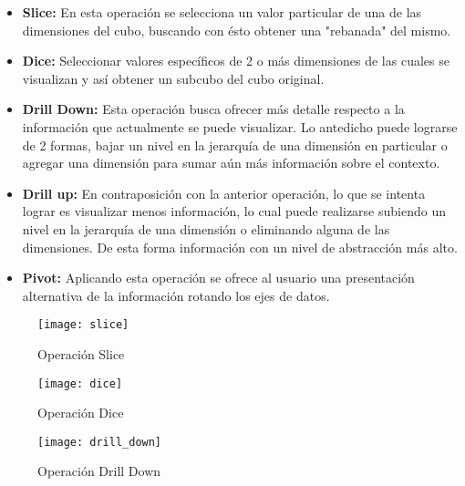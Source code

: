 \documentclass[a4paper,11pt]{article}
\begin{document}
\begin{flushleft}
    \begin{itemize}
      \item \textbf{Slice:} En esta operación se selecciona un valor particular de una de las dimensiones del cubo, buscando con ésto obtener una "rebanada" del
      mismo.
      \item \textbf{Dice:} Seleccionar valores específicos de 2 o más dimensiones de las cuales se visualizan y así obtener un subcubo del cubo original.
      \item \textbf{Drill Down:} Esta operación busca ofrecer más detalle respecto a la información que actualmente se puede visualizar. Lo antedicho puede
      lograrse de 2 formas, bajar un nivel en la jerarquía de una dimensión en particular o agregar una dimensión para sumar aún más información sobre el contexto.
      \item \textbf{Drill up:} En contraposición con la anterior operación, lo que se intenta lograr es visualizar menos información, lo cual puede realizarse
      subiendo un nivel en la jerarquía de una dimensión o eliminando alguna de las dimensiones. De esta forma información con un nivel de abstracción más alto.
      \item \textbf{Pivot:} Aplicando esta operación se ofrece al usuario una presentación alternativa de la información rotando los ejes de datos.
    \end{itemize}
    
    \begin{figure}
      \begin{center}
        \texttt{[image: slice]}
        \caption{Operación Slice} \cite{operaciones}
        \label{slice}
      \end{center}
    \end{figure}
    
    \begin{figure}
      \begin{center}
        \texttt{[image: dice]}
        \caption{Operación Dice} \cite{operaciones}
        \label{dice}
      \end{center}
    \end{figure}
    
    \begin{figure}
      \begin{center}
        \texttt{[image: drill\_down]}
        \caption{Operación Drill Down} \cite{operaciones}
        \label{drill_down}
      \end{center}
    \end{figure}
    

\end{flushleft}
\end{document}
